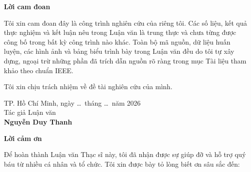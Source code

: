 
\clearpage
\thispagestyle{empty}
\begin{center}
{\fontsize{14}{17}\bfseries\MakeUppercase Lời cam đoan\par}
\end{center}
\vspace{1cm}

\hspace{1.27cm}Tôi xin cam đoan đây là công trình nghiên cứu của riêng tôi. Các
số liệu, kết quả thực nghiệm và kết luận nêu trong Luận văn là trung thực và
chưa từng được công bố trong bất kỳ công trình nào khác. Toàn bộ mã nguồn,
dữ liệu huấn luyện, các hình ảnh và bảng biểu trình bày trong Luận văn đều
do tôi tự xây dựng, ngoại trừ những phần đã trích dẫn nguồn rõ ràng trong
mục Tài liệu tham khảo theo chuẩn IEEE.

\vspace{0.5cm}
\hspace{1.27cm}Tôi xin chịu trách nhiệm về đề tài nghiên cứu của mình.

\vspace{2cm}
\begin{flushright}
\begin{minipage}{0.45\textwidth}
\centering
TP. Hồ Chí Minh, ngày \ldots\ tháng \ldots\ năm 2026\\[0.3cm]
Tác giả Luận văn\\[2.5cm]
\textbf{Nguyễn Duy Thanh}
\end{minipage}
\end{flushright}

\clearpage
\thispagestyle{empty}
\begin{center}
{\fontsize{14}{17}\bfseries\MakeUppercase Lời cảm ơn\par}
\end{center}
\vspace{1cm}

\hspace{1.27cm}Để hoàn thành Luận văn Thạc sĩ này, tôi đã nhận được sự giúp đỡ
và hỗ trợ quý báu từ nhiều cá nhân và tổ chức. Tôi xin được bày tỏ lòng biết ơn
sâu sắc đến:


